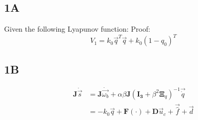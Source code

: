 \subsection{1A}
Given the following Lyapunov function:
Proof:
\begin{equation}
    V_{1}=k_{0}\vec{q}^T\vec{q}+k_{0}(1-q_{0})^T
\end{equation}

\subsection{1B}
\begin{equation}
    \begin{split}
        \mathbf{J}\dot{\vec{s}}&=
        \mathbf{J}\dot{\vec{\omega_b}} + \alpha\beta\mathbf{J}(\mathbf{I_3}+\beta^2\mathbf{\Xi}_q)^{-1}\vec{\dot{q}}\\
        &=-k_0\vec{q}+\mathbf{F}(\cdot)+\mathbf{D}\vec{u}_{c}+\vec{\hat{f}}+\vec{d}
    \end{split}
\end{equation}